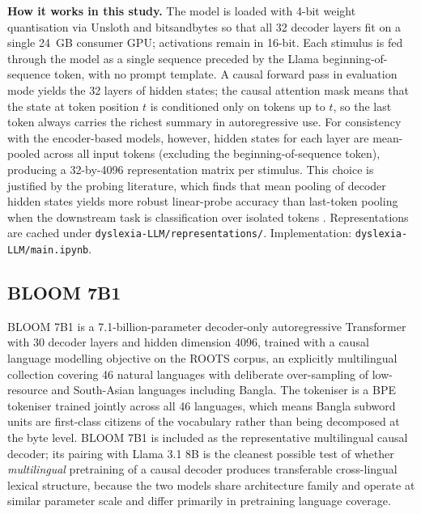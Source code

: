 \textbf{How it works in this study.} The model is loaded with 4-bit weight quantisation via Unsloth and bitsandbytes \cite{dettmers2022bnb} so that all 32 decoder layers fit on a single 24~GB consumer GPU; activations remain in 16-bit. Each stimulus is fed through the model as a single sequence preceded by the Llama beginning-of-sequence token, with no prompt template. A causal forward pass in evaluation mode yields the 32 layers of hidden states; the causal attention mask means that the state at token position $t$ is conditioned only on tokens up to $t$, so the last token always carries the richest summary in autoregressive use. For consistency with the encoder-based models, however, hidden states for each layer are mean-pooled across all input tokens (excluding the beginning-of-sequence token), producing a 32-by-4096 representation matrix per stimulus. This choice is justified by the probing literature, which finds that mean pooling of decoder hidden states yields more robust linear-probe accuracy than last-token pooling when the downstream task is classification over isolated tokens \cite{conneau2018probing}. Representations are cached under \texttt{dyslexia-LLM/representations/}. Implementation: \texttt{dyslexia-LLM/main.ipynb}.

\subsection{BLOOM 7B1}

BLOOM 7B1 \cite{scao2022bloom} is a 7.1-billion-parameter decoder-only autoregressive Transformer with 30 decoder layers and hidden dimension 4096, trained with a causal language modelling objective on the ROOTS corpus, an explicitly multilingual collection covering 46 natural languages with deliberate over-sampling of low-resource and South-Asian languages including Bangla. The tokeniser is a BPE tokeniser trained jointly across all 46 languages, which means Bangla subword units are first-class citizens of the vocabulary rather than being decomposed at the byte level. BLOOM 7B1 is included as the representative multilingual causal decoder; its pairing with Llama 3.1 8B is the cleanest possible test of whether \emph{multilingual} pretraining of a causal decoder produces transferable cross-lingual lexical structure, because the two models share architecture family and operate at similar parameter scale and differ primarily in pretraining language coverage.

